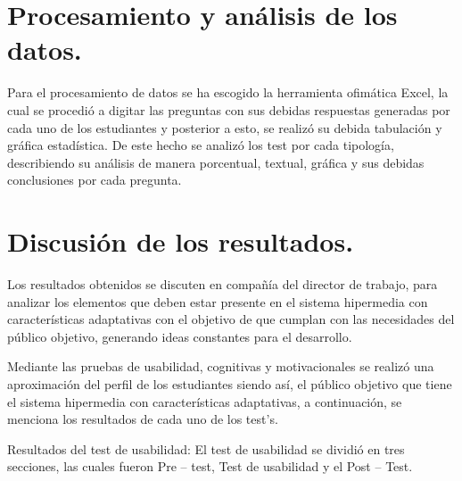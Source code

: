 \section{Procesamiento y análisis de los datos.}

Para el procesamiento de datos se ha escogido la herramienta ofimática Excel, la cual se procedió a digitar las preguntas con sus debidas respuestas generadas por cada uno de los estudiantes y posterior a esto, se realizó su debida tabulación y gráfica estadística. De este hecho se analizó los test por cada tipología, describiendo su análisis de manera porcentual, textual, gráfica y sus debidas conclusiones por cada pregunta.

\section{Discusión de los resultados.}

Los resultados obtenidos se discuten en compañía del director de trabajo, para analizar los elementos que deben estar presente en el sistema hipermedia con características adaptativas con el objetivo de que cumplan con las necesidades del público objetivo, generando ideas constantes para el desarrollo.

Mediante las pruebas de usabilidad, cognitivas y motivacionales se realizó una aproximación del perfil de los estudiantes siendo así, el público objetivo que tiene el sistema hipermedia con características adaptativas, a continuación, se menciona los resultados de cada uno de los test’s.

Resultados del test de usabilidad: El test de usabilidad se dividió en tres secciones, las cuales fueron Pre – test, Test de usabilidad y el Post – Test.

